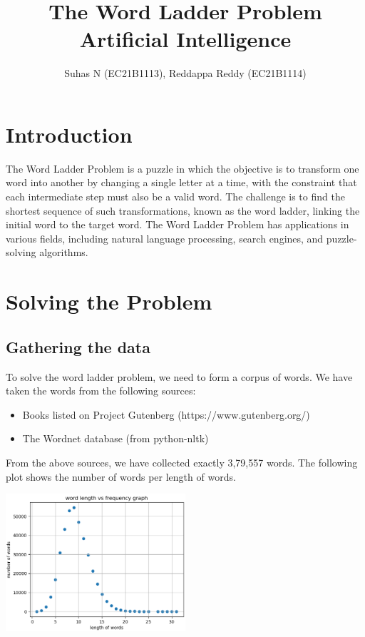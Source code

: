 \documentclass[]{article}
\title{\textbf{The Word Ladder Problem }\\ Artificial Intelligence}
\author{Suhas N (EC21B1113), Reddappa Reddy (EC21B1114)}
\begin{document}
\maketitle

\section{Introduction}

The Word Ladder Problem is a puzzle in which the objective is to transform one word into another by changing a single letter at a time, with the constraint that each intermediate step must also be a valid word. The challenge is to find the shortest sequence of such transformations, known as the word ladder, linking the initial word to the target word. The Word Ladder Problem has applications in various fields, including natural language processing, search engines, and puzzle-solving algorithms.

\section{Solving the Problem}

\subsection{Gathering the data}

To solve the word ladder problem, we need to form a corpus of words. We have taken the words from the following sources:

\begin{itemize}
	\item Books listed on Project Gutenberg (https://www.gutenberg.org/)
	\item The Wordnet database (from python-nltk)
\end{itemize}

From the above sources, we have collected exactly 3,79,557 words. The following plot shows the number of words per length of words.

\begin{center}
\includegraphics[width=0.5\textwidth]{./images/histogram.png}
\end{center}
\end{document}
